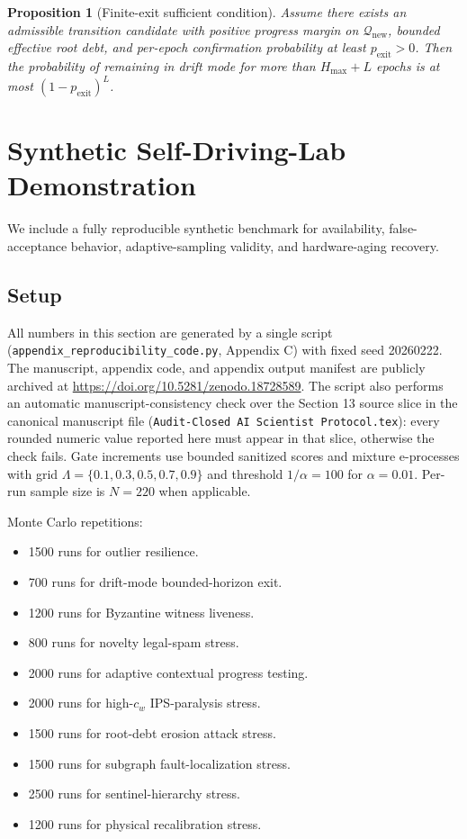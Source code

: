 \documentclass[11pt,a4paper]{article}
\newtheorem{proposition}[theorem]{Proposition}
\begin{document}
\begin{proposition}[Finite-exit sufficient condition]
Assume there exists an admissible transition candidate with positive progress margin on $\mathcal{Q}_{\mathrm{new}}$, bounded effective root debt, and per-epoch confirmation probability at least $p_{\mathrm{exit}}>0$.
Then the probability of remaining in drift mode for more than $H_{\max}+L$ epochs is at most $(1-p_{\mathrm{exit}})^L$.
\end{proposition}

\section{Synthetic Self-Driving-Lab Demonstration}

We include a fully reproducible synthetic benchmark for availability, false-acceptance behavior, adaptive-sampling validity, and hardware-aging recovery.

\subsection{Setup}
All numbers in this section are generated by a single script (\texttt{appendix\_reproducibility\_code.py}, Appendix C) with fixed seed 20260222.
The manuscript, appendix code, and appendix output manifest are publicly archived at \url{https://doi.org/10.5281/zenodo.18728589}.
The script also performs an automatic manuscript-consistency check over the Section 13 source slice in the canonical manuscript file (\texttt{Audit-Closed AI Scientist Protocol.tex}): every rounded numeric value reported here must appear in that slice, otherwise the check fails.
Gate increments use bounded sanitized scores and mixture e-processes with grid
$\Lambda=\{0.1,0.3,0.5,0.7,0.9\}$ and threshold $1/\alpha=100$ for $\alpha=0.01$.
Per-run sample size is $N=220$ when applicable.

Monte Carlo repetitions:
\begin{itemize}[leftmargin=*]
\item 1500 runs for outlier resilience.
\item 700 runs for drift-mode bounded-horizon exit.
\item 1200 runs for Byzantine witness liveness.
\item 800 runs for novelty legal-spam stress.
\item 2000 runs for adaptive contextual progress testing.
\item 2000 runs for high-$c_w$ IPS-paralysis stress.
\item 1500 runs for root-debt erosion attack stress.
\item 1500 runs for subgraph fault-localization stress.
\item 2500 runs for sentinel-hierarchy stress.
\item 1200 runs for physical recalibration stress.
\end{itemize}
\end{document}
